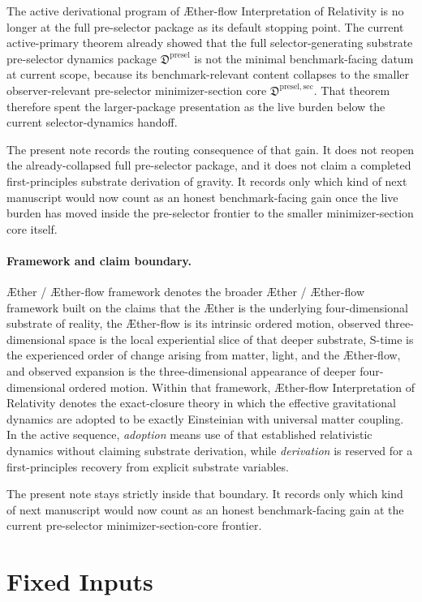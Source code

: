 \documentclass[11pt]{article}
\newcommand{\Aether}{\AE{}ther}
\newcommand{\Aflow}{\AE{}ther-flow}
\newcommand{\TheoryName}{\Aflow{} Interpretation of Relativity}
\newcommand{\TheoryProgram}{\Aether{} / \Aflow{} framework}
\newcommand{\PreSelectorPackage}{\mathfrak D^{\mathrm{presel}}}
\newcommand{\PreSelectorMinSectionCore}{\mathfrak D^{\mathrm{presel,sec}}}
\begin{document}
The active derivational program of \TheoryName{} is no longer at the full pre-selector package as its default stopping point. The current active-primary theorem already showed that the full selector-generating substrate pre-selector dynamics package \(\PreSelectorPackage\) is not the minimal benchmark-facing datum at current scope, because its benchmark-relevant content collapses to the smaller observer-relevant pre-selector minimizer-section core \(\PreSelectorMinSectionCore\). That theorem therefore spent the larger-package presentation as the live burden below the current selector-dynamics handoff.

The present note records the routing consequence of that gain. It does not reopen the already-collapsed full pre-selector package, and it does not claim a completed first-principles substrate derivation of gravity. It records only which kind of next manuscript would now count as an honest benchmark-facing gain once the live burden has moved inside the pre-selector frontier to the smaller minimizer-section core itself.

\paragraph{Framework and claim boundary.}
\TheoryProgram{} denotes the broader \Aether{} / \Aflow{} framework built on the claims that the \Aether{} is the underlying four-dimensional substrate of reality, the \Aflow{} is its intrinsic ordered motion, observed three-dimensional space is the local experiential slice of that deeper substrate, S-time is the experienced order of change arising from matter, light, and the \Aflow{}, and observed expansion is the three-dimensional appearance of deeper four-dimensional ordered motion. Within that framework, \TheoryName{} denotes the exact-closure theory in which the effective gravitational dynamics are adopted to be exactly Einsteinian with universal matter coupling. In the active sequence, \emph{adoption} means use of that established relativistic dynamics without claiming substrate derivation, while \emph{derivation} is reserved for a first-principles recovery from explicit substrate variables.

The present note stays strictly inside that boundary. It records only which kind of next manuscript would now count as an honest benchmark-facing gain at the current pre-selector minimizer-section-core frontier.

\section{Fixed Inputs}
\end{document}
